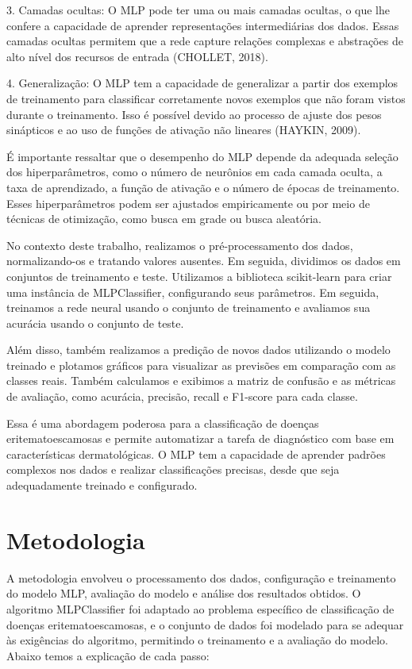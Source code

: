 \documentclass[conference]{IEEEtran}
\begin{document}
3. Camadas ocultas: O MLP pode ter uma ou mais camadas ocultas, o que lhe confere a capacidade de aprender representações intermediárias dos dados. Essas camadas ocultas permitem que a rede capture relações complexas e abstrações de alto nível dos recursos de entrada (CHOLLET, 2018).

4. Generalização: O MLP tem a capacidade de generalizar a partir dos exemplos de treinamento para classificar corretamente novos exemplos que não foram vistos durante o treinamento. Isso é possível devido ao processo de ajuste dos pesos sinápticos e ao uso de funções de ativação não lineares (HAYKIN, 2009).

É importante ressaltar que o desempenho do MLP depende da adequada seleção dos hiperparâmetros, como o número de neurônios em cada camada oculta, a taxa de aprendizado, a função de ativação e o número de épocas de treinamento. Esses hiperparâmetros podem ser ajustados empiricamente ou por meio de técnicas de otimização, como busca em grade ou busca aleatória.

No contexto deste trabalho, realizamos o pré-processamento dos dados, normalizando-os e tratando valores ausentes. Em seguida, dividimos os dados em conjuntos de treinamento e teste. Utilizamos a biblioteca scikit-learn para criar uma instância de MLPClassifier, configurando seus parâmetros. Em seguida, treinamos a rede neural usando o conjunto de treinamento e avaliamos sua acurácia usando o conjunto de teste.

Além disso, também realizamos a predição de novos dados utilizando o modelo treinado e plotamos gráficos para visualizar as previsões em comparação com as classes reais. Também calculamos e exibimos a matriz de confusão e as métricas de avaliação, como acurácia, precisão, recall e F1-score para cada classe.

Essa é uma abordagem poderosa para a classificação de doenças eritematoescamosas e permite automatizar a tarefa de diagnóstico com base em características dermatológicas. O MLP tem a capacidade de aprender padrões complexos nos dados e realizar classificações precisas, desde que seja adequadamente treinado e configurado.

\section{Metodologia}
A metodologia envolveu o processamento dos dados, configuração e treinamento do modelo MLP, avaliação do modelo e análise dos resultados obtidos. O algoritmo MLPClassifier foi adaptado ao problema específico de classificação de doenças eritematoescamosas, e o conjunto de dados foi modelado para se adequar às exigências do algoritmo, permitindo o treinamento e a avaliação do modelo. Abaixo temos a explicação de cada passo:
\end{document}
